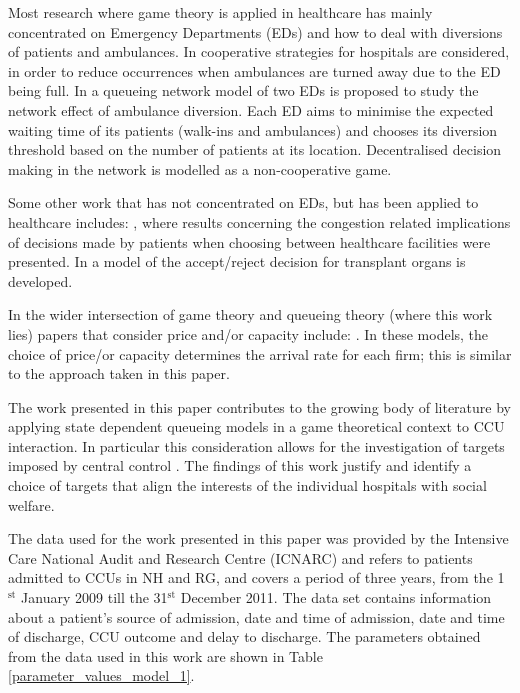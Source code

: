\documentclass{article}
\begin{document}
Most research where game theory is applied in healthcare has mainly concentrated on Emergency Departments (EDs) and how to deal with diversions of patients and ambulances.
In \cite{Hagtvedt2009} cooperative strategies for hospitals are considered, in order to reduce occurrences when ambulances are turned away due to the ED being full.
In \cite{Deo2011} a queueing network model of two EDs is proposed to study the network effect of ambulance diversion.
Each ED aims to minimise the expected waiting time of its patients (walk-ins and ambulances) and chooses its diversion threshold based on the number of patients at its location. Decentralised decision making in the network is modelled as a non-cooperative game.

Some other work that has not concentrated on EDs, but has been applied to healthcare includes: \cite{Knight2013}, where results concerning the congestion related implications of decisions made by patients when choosing between healthcare facilities were presented. In \cite{Howard2002} a model of the accept/reject decision for transplant organs is developed.

In the wider intersection of game theory and queueing theory (where this work lies) papers that consider price and/or capacity include: \cite{Allon2007, Cachon2002,  Cachon2007, Kalai1992, Levhari1978}. In these models, the choice of price/or capacity determines the arrival rate for each firm; this is similar to the approach taken in this paper.

The work presented in this paper contributes to the growing body of literature by applying state dependent queueing models in a game theoretical context to CCU interaction.
In particular this consideration allows for the investigation of targets imposed by central control \cite{Bevan2006}.
The findings of this work justify and identify a choice of targets that align the interests of the individual hospitals with social welfare.

The data used for the work presented in this paper was provided by the Intensive Care National Audit and Research Centre (ICNARC) and refers to patients admitted to CCUs in NH and RG, and covers a period of three years, from the 1$^{\text{st}}$ January 2009 till the 31$^{\text{st}}$ December 2011.
The data set contains information about a patient's source of admission, date and time of admission, date and time of discharge, CCU outcome and delay to discharge.
The parameters obtained from the data used in this work are shown in Table \ref{parameter_values_model_1}.
\end{document}
